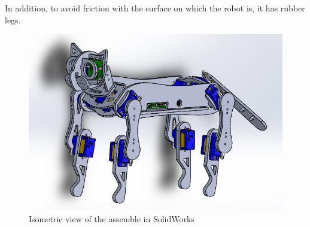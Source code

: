 \documentclass[runningheads,a4paper,12pt]{report}
\begin{document}
In addition, to avoid friction with the surface on which the robot is, it has rubber legs. 

\begin{figure}
	\centering

  	\includegraphics[width=.6\linewidth]{./images/3_hardware}\hfill

    \caption{Isometric view of the assemble in SolidWorks}  
    \label{fig:3_hardware}
\end{figure}
\end{document}
